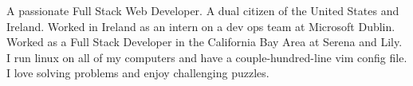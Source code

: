 

\begin{cvparagraph}

A passionate Full Stack Web Developer. A dual citizen of the United States and Ireland. Worked in Ireland as an intern on a dev ops team at Microsoft Dublin. Worked as a Full Stack Developer in the California Bay Area at Serena and Lily. I run linux on all of my computers and have a couple-hundred-line vim config file. I love solving problems and enjoy challenging puzzles.
\end{cvparagraph}
